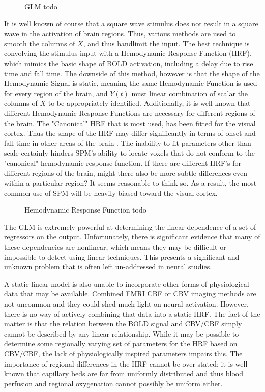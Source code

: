 \begin{figure}
\caption{GLM todo}
\label{fig:GLM}
\end{figure}

It is well known of course that a square wave stimulus does not result in a square wave
in the activation of brain regions. Thus, various methods are used to 
smooth the columns of $X$, and thus bandlimit the input. 
The best technique is convolving the stimulus input with a Hemodynamic 
Response Function (HRF), which mimics the basic shape of BOLD activation, including a delay
due to rise time and fall time. The downside of this method, however is that 
the shape of the Hemodynamic Signal is static, meaning the same Hemodynamic Function is
used for every region of the brain, and $Y(t)$ must linear combination 
of scalar the columns of $X$ to be appropriately identified. Additionally, 
it is well known that different Hemodynamic Response Functions are necessary for different 
regions of the brain. The "Canonical" HRF that is most used, has been fitted
for the visual cortex. Thus the shape of the HRF may differ significantly in
terms of onset and fall time in other areas of the brain \cite{Handwerker2004}. 
The inability to
fit parameters other than scale certainly hinders SPM's
ability to locate voxels that do not conform to the "canonical" hemodynamic 
response function. If there are different HRF's for different regions 
of the brain, might there also be more subtle differences even within
a particular region? It seems reasonable to think so. As a result, the 
most common use of SPM will be heavily biased toward the visual cortex.

\begin{figure}
\caption{Hemodynamic Response Function todo}
\label{fig:HRF}
\end{figure}

The GLM is extremely powerful at determining the linear dependence of
a set of regressors on the output. Unfortunately, there is significant evidence
that many of these dependencies are nonlinear, which means they may be
difficult or impossible to detect using linear techniques. This presents
a significant and unknown problem that is often left un-addressed in 
neural studies.

A static linear model is also unable to incorporate other forms of physiological
data that may be available. Combined FMRI
CBF or CBV imaging methods are not uncommon and they could shed much light on
neural activation. However, there is no way of actively combining that data 
into a static HRF. The fact of the matter is that the relation between the 
BOLD signal and CBV/CBF simply cannot be described by any linear relationship.
While it may be possible to determine some regionally varying set of parameters
for the HRF based on CBV/CBF, the lack of physiologically inspired parameters
impairs this. The importance of regional differences in the HRF cannot be
over-stated; it is well known that capillary beds are far from uniformly distributed
and thus blood perfusion and regional oxygenation cannot possibly be uniform
either. 

